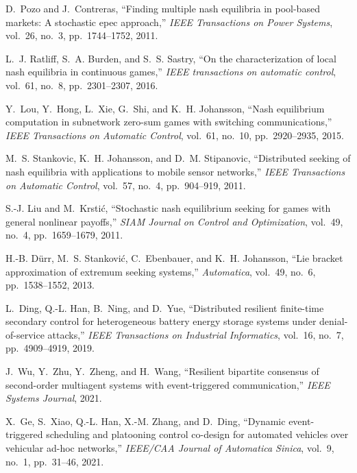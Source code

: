 \documentclass[lettersize,journal]{IEEEtran}
\begin{document}
\begin{thebibliography}{10}

    D.~Pozo and J.~Contreras, ``Finding multiple nash equilibria in pool-based markets: A stochastic epec approach,'' {\em IEEE Transactions on Power Systems}, vol.~26, no.~3, pp.~1744--1752, 2011.

    L.~J. Ratliff, S.~A. Burden, and S.~S. Sastry, ``On the characterization of local nash equilibria in continuous games,'' {\em IEEE transactions on automatic control}, vol.~61, no.~8, pp.~2301--2307, 2016.

    Y.~Lou, Y.~Hong, L.~Xie, G.~Shi, and K.~H. Johansson, ``Nash equilibrium computation in subnetwork zero-sum games with switching communications,'' {\em IEEE Transactions on Automatic Control}, vol.~61, no.~10, pp.~2920--2935, 2015.

    M.~S. Stankovic, K.~H. Johansson, and D.~M. Stipanovic, ``Distributed seeking of nash equilibria with applications to mobile sensor networks,'' {\em IEEE Transactions on Automatic Control}, vol.~57, no.~4, pp.~904--919, 2011.

    S.-J. Liu and M.~Krsti{\'c}, ``Stochastic nash equilibrium seeking for games with general nonlinear payoffs,'' {\em SIAM Journal on Control and Optimization}, vol.~49, no.~4, pp.~1659--1679, 2011.

    H.-B. D{\"u}rr, M.~S. Stankovi{\'c}, C.~Ebenbauer, and K.~H. Johansson, ``Lie bracket approximation of extremum seeking systems,'' {\em Automatica}, vol.~49, no.~6, pp.~1538--1552, 2013.

    L.~Ding, Q.-L. Han, B.~Ning, and D.~Yue, ``Distributed resilient finite-time secondary control for heterogeneous battery energy storage systems under denial-of-service attacks,'' {\em IEEE Transactions on Industrial Informatics}, vol.~16, no.~7, pp.~4909--4919, 2019.

    J.~Wu, Y.~Zhu, Y.~Zheng, and H.~Wang, ``Resilient bipartite consensus of second-order multiagent systems with event-triggered communication,'' {\em IEEE Systems Journal}, 2021.

    X.~Ge, S.~Xiao, Q.-L. Han, X.-M. Zhang, and D.~Ding, ``Dynamic event-triggered scheduling and platooning control co-design for automated vehicles over vehicular ad-hoc networks,'' {\em IEEE/CAA Journal of Automatica Sinica}, vol.~9, no.~1, pp.~31--46, 2021.


\end{thebibliography}
\end{document}
